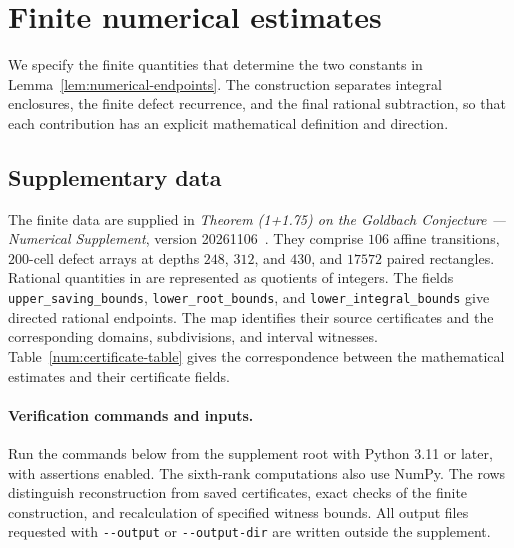 \section{Finite numerical estimates}\label{app:numeric}

We specify the finite quantities that determine the two constants
in Lemma~\ref{lem:numerical-endpoints}. The construction separates
integral enclosures, the finite defect recurrence, and the final
rational subtraction, so that each contribution has an explicit
mathematical definition and direction.

\subsection{Supplementary data}
The finite data are supplied in \emph{Theorem (1+1.75) on the Goldbach
Conjecture --- Numerical Supplement}, version 20261106~\cite{ChanSupplement}.
They comprise $106$ affine transitions, $200$-cell defect arrays at
depths $248$, $312$, and $430$, and $17572$ paired rectangles.
Rational quantities in  are
represented as quotients of integers. The fields
\texttt{upper\_saving\_bounds}, \texttt{lower\_root\_bounds}, and
\texttt{lower\_integral\_bounds} give directed rational endpoints.
The map  identifies their source
certificates and the corresponding domains, subdivisions, and interval
witnesses. Table~\ref{num:certificate-table} gives the correspondence
between the mathematical estimates and their certificate fields.

\hypertarget{num:verification-scope}{}
\paragraph{Verification commands and inputs.}
Run the commands below from the supplement root with Python 3.11 or later,
with assertions enabled. The sixth-rank computations also use NumPy.
The rows distinguish reconstruction from saved certificates, exact checks of
the finite construction, and recalculation of specified witness bounds.
All output files requested with \texttt{-{}-output} or \texttt{-{}-output-dir}
are written outside the supplement.

